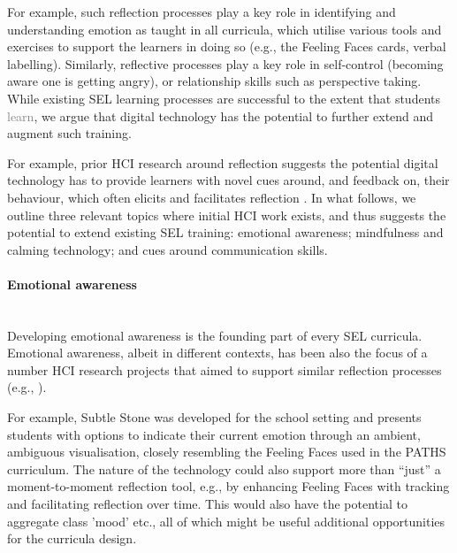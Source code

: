 \documentclass[prodmode,acmtochi]{acmsmall}
\newcommand{\rephrase}[1]{\textrm{\textrm{\textcolor{gray}{#1}}}}
\begin{document}
For example, such reflection processes play a key role in identifying and understanding emotion as taught in all curricula, which utilise various tools and exercises to support the learners in doing so (e.g., the Feeling Faces cards, verbal labelling). Similarly, reflective processes play a key role in self-control (becoming aware one is getting angry), or relationship skills such as perspective taking. While existing SEL learning processes are successful to the extent that students \rephrase{learn}, we argue that digital technology has the potential to further extend and augment such training. 

For example, prior HCI research around reflection suggests the potential digital technology has to provide learners with novel cues around, and feedback on, their behaviour, which often elicits and facilitates reflection \cite{Moon,Fleck,Sas}. In what follows, we outline three relevant topics where initial HCI work exists, and thus suggests the potential to extend existing SEL training: emotional awareness; mindfulness and calming technology; and cues around communication skills. 
	


        \paragraph{Emotional awareness}~\\
        \label{sec:emaware}
Developing emotional awareness is the founding part of every SEL curricula. Emotional awareness, albeit in different contexts, has been also the focus of a number HCI research projects that aimed to support similar reflection processes (e.g., \cite{Fleck2010,Sas2011}). 

For example, Subtle Stone \cite{Balaam2010} was developed for the school setting and presents students with options to indicate their current emotion through an ambient, ambiguous visualisation, closely resembling the Feeling Faces used in the PATHS curriculum. The nature of the technology could also support more than ``just'' a moment-to-moment reflection tool, e.g., by enhancing Feeling Faces with tracking and facilitating reflection over time. This would also have the potential to aggregate class 'mood'  etc., all of which might be useful additional opportunities for the curricula design. 
\end{document}
